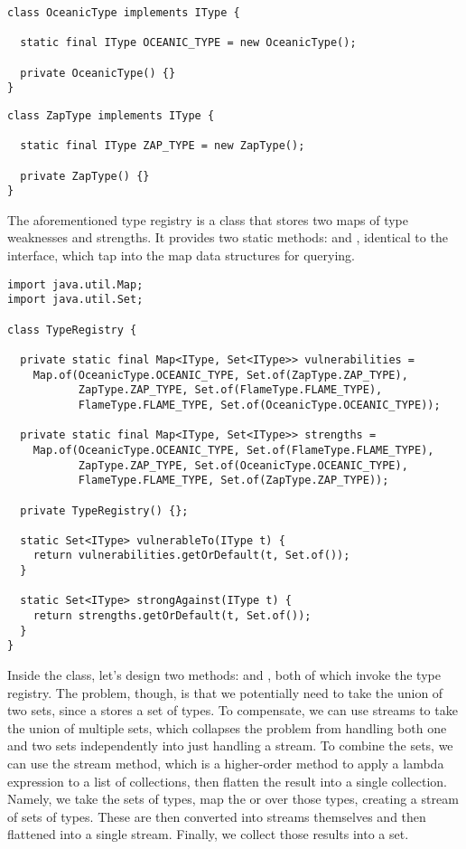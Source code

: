 \begin{lstlisting}[language=MyJava]
class OceanicType implements IType {

  static final IType OCEANIC_TYPE = new OceanicType();

  private OceanicType() {}
}
\end{lstlisting}

\begin{lstlisting}[language=MyJava]
class ZapType implements IType {

  static final IType ZAP_TYPE = new ZapType();

  private ZapType() {}
}
\end{lstlisting}

The aforementioned type registry is a class that stores two maps of type weaknesses and strengths. 
It provides two static methods:  and , identical to the  interface, which tap into the map data structures for querying.

\begin{lstlisting}[language=MyJava]
import java.util.Map;
import java.util.Set;

class TypeRegistry {

  private static final Map<IType, Set<IType>> vulnerabilities =
    Map.of(OceanicType.OCEANIC_TYPE, Set.of(ZapType.ZAP_TYPE),
           ZapType.ZAP_TYPE, Set.of(FlameType.FLAME_TYPE),
           FlameType.FLAME_TYPE, Set.of(OceanicType.OCEANIC_TYPE));

  private static final Map<IType, Set<IType>> strengths =
    Map.of(OceanicType.OCEANIC_TYPE, Set.of(FlameType.FLAME_TYPE),
           ZapType.ZAP_TYPE, Set.of(OceanicType.OCEANIC_TYPE),
           FlameType.FLAME_TYPE, Set.of(ZapType.ZAP_TYPE));

  private TypeRegistry() {};

  static Set<IType> vulnerableTo(IType t) {
    return vulnerabilities.getOrDefault(t, Set.of());
  }

  static Set<IType> strongAgainst(IType t) {
    return strengths.getOrDefault(t, Set.of());
  }
}
\end{lstlisting}

Inside the  class, let's design two methods:  and , both of which invoke the type registry. 
The problem, though, is that we potentially need to take the union of two sets, since a  stores a set of types. 
To compensate, we can use streams to take the union of multiple sets, which collapses the problem from handling both one and two sets independently into just handling a stream. 
To combine the sets, we can use the  stream method, which is a higher-order method to apply a lambda expression to a list of collections, then flatten the result into a single collection. 
Namely, we take the sets of types, map the  or  over those types, creating a stream of sets of types. 
These are then converted into streams themselves and then flattened into a single stream. 
Finally, we collect those results into a set. 

